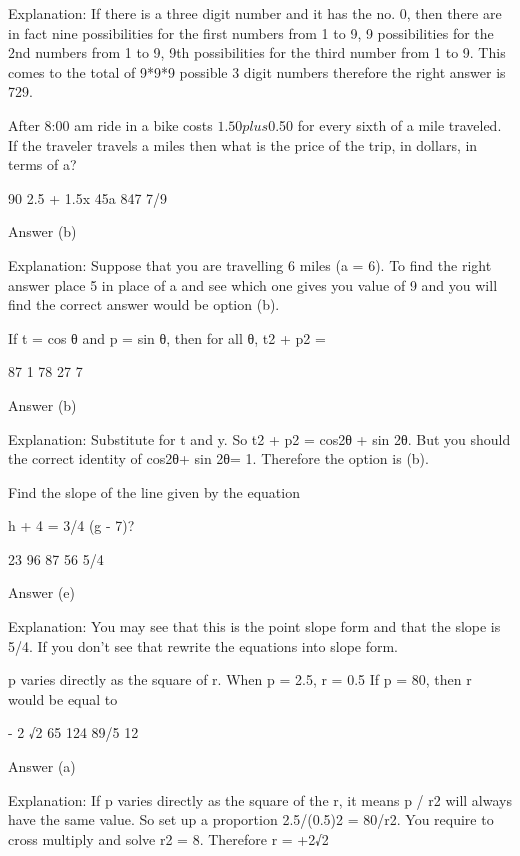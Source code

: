     Explanation: If there is a three digit number and it has the no. 0, then there are in fact nine possibilities for the first numbers from 1 to 9, 9 possibilities for the 2nd numbers from 1 to 9, 9th possibilities for the third number from 1 to 9. This comes to the total of 9*9*9 possible 3 digit numbers therefore the right answer is 729.

    After 8:00 am ride in a bike costs $1.50 plus $0.50 for every sixth of a mile traveled. If the traveler travels a miles then what is the price of the trip, in dollars, in terms of a?

        90
        2.5 + 1.5x
        45a
        847
        7/9 

    Answer (b)

    Explanation: Suppose that you are travelling 6 miles (a = 6). To find the right answer place 5 in place of a and see which one gives you value of 9 and you will find the correct answer would be option (b).

    If t = cos θ and p = sin θ, then for all θ, t2 + p2 =

        87
        1
        78
        27
        7 

    Answer (b)

    Explanation: Substitute for t and y. So t2 + p2 = cos2θ + sin 2θ. But you should the correct identity of cos2θ+ sin 2θ= 1. Therefore the option is (b).

    Find the slope of the line given by the equation

    h + 4 = 3/4 (g - 7)?

        23
        96
        87
        56
        5/4 

    Answer (e)

    Explanation: You may see that this is the point slope form and that the slope is 5/4. If you don't see that rewrite the equations into slope form. 



    p varies directly as the square of r. When p = 2.5, r = 0.5 If p = 80, then r would be equal to

        - 2 √2
        65
        124
        89/5
        12 

    Answer (a)

    Explanation: If p varies directly as the square of the r, it means p / r2 will always have the same value. So set up a proportion 2.5/(0.5)2 = 80/r2. You require to cross multiply and solve r2 = 8. Therefore r = +2√2

